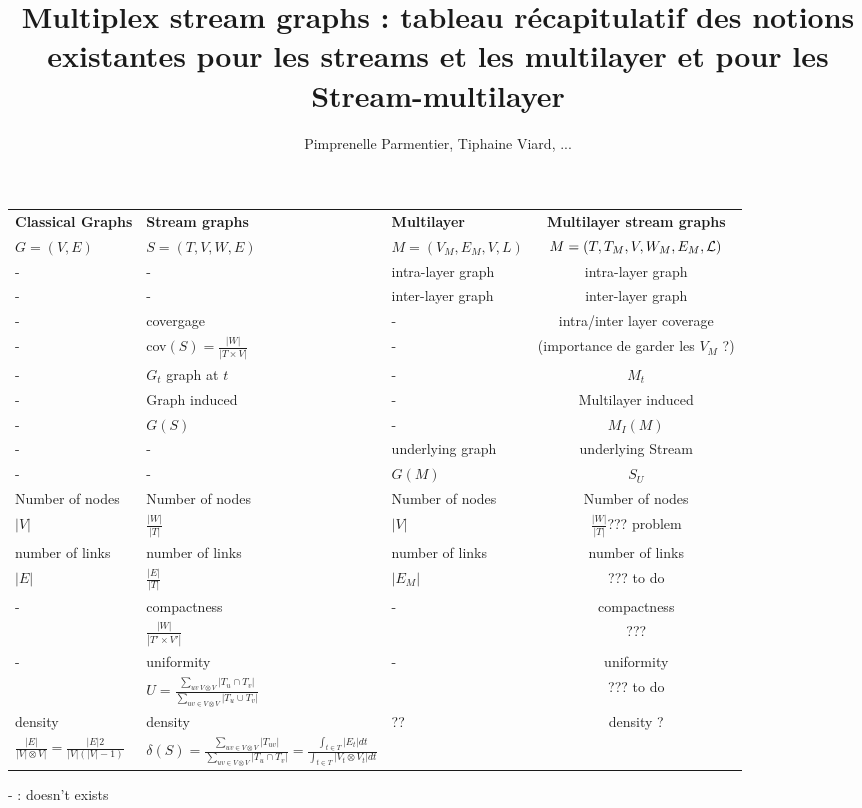\documentclass[dvipsnames,a4paper,11pt]{article}
\title{Multiplex stream graphs : tableau récapitulatif des notions existantes pour les streams et les multilayer et pour les Stream-multilayer}
\author{Pimprenelle Parmentier, Tiphaine Viard, ...}
\begin{document}
    \maketitle
	\begin{tabularx}{\linewidth}{|X||X|X||c|}
		\hline
		\textbf{Classical Graphs} & \textbf{Stream graphs} & \textbf{Multilayer} & \textbf{Multilayer stream graphs}\\
		$G=(V,E)$ & $S = (T,V,W,E)$ &  $M= (V_M,E_M,V,L)$ & $M = (T,T_M,V,W_M,E_M,{\cal L})$\\
		\hline
		\hline
		- & - & intra-layer graph & intra-layer graph\\
		\hline
		- & - & inter-layer graph & inter-layer graph \\
		\hline
		\hline
		- & covergage & - & intra/inter layer coverage \\
		- & cov$(S)=\frac{|W|}{|T\times V|}$&-& (importance de garder les $V_M$ ?)\\
		\hline
		- & $G_t$ graph at $t$ & - & $M_t$ \\
		\hline
		- & Graph induced & - & Multilayer induced \\
		\hline
		- & $G(S)$ & - & $M_I(M)$\\
		\hline
		- & - & underlying graph & underlying Stream \\
		- & - & $G(M)$ & $S_U$\\
		\hline
		Number of nodes & Number of nodes & Number of nodes & Number of nodes \\
		$|V|$ & $\frac{|W|}{|T|}$ & $|V|$ & $\frac{|W|}{|T|}$??? problem\\
		\hline
		number of links & number of links & number of links & number of links\\
		$|E|$ & $\frac{|E|}{|T|}$ & $|E_M|$ & ??? to do\\
		\hline
		- & compactness & - & compactness \\
		 & $\frac{|W|}{|T'\times V'|}$& &???\\
		 \hline
		 - & uniformity & - & uniformity \\
		 & $U = \frac{\sum_{uv \ V \otimes V}{|T_u \cap T_v|}}{\sum_{uv \in V\otimes V}{|T_u\cup T_v|}}$& & ??? to do\\
		 \hline
		 density & density & ?? & density ? \\
		 $\frac{|E|}{|V|\otimes V|} = \frac{|E|2}{|V|(|V|-1)} $& $\delta(S) = \frac{\sum_{uv \in V \otimes V}{|T_{uv}|}}{\sum_{uv \in V\otimes V}{|T_u\cap T_v|}}= \frac{\int_{t\in T}{|E_t|dt}}{\int_{t\in T}{|V_t\otimes V_t|dt}}$ & & \\
		 \hline
		 \hline
		 
	\end{tabularx}
	- : doesn't exists
	
\end{document}
